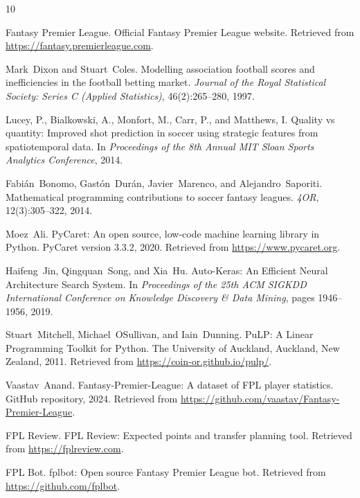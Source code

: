 \documentclass[11pt,english,listoffigures,listoftables]{tfgetsinf}
\begin{document}
\begin{thebibliography}{10}

   Fantasy Premier League.
   \newblock Official Fantasy Premier League website.
   \newblock Retrieved from \url{https://fantasy.premierleague.com}.

   Mark~Dixon and Stuart~Coles.
   \newblock Modelling association football scores and inefficiencies in the football betting market.
   \newblock \textit{Journal of the Royal Statistical Society: Series C (Applied Statistics)}, 46(2):265--280, 1997.

   Lucey, P., Bialkowski, A., Monfort, M., Carr, P., and Matthews, I.
   \newblock Quality vs quantity: Improved shot prediction in soccer using strategic features from spatiotemporal data.
   \newblock In \textit{Proceedings of the 8th Annual MIT Sloan Sports Analytics Conference}, 2014.

   Fabi\'{a}n~Bonomo, Gast\'{o}n~Dur\'{a}n, Javier~Marenco, and Alejandro~Saporiti.
   \newblock Mathematical programming contributions to soccer fantasy leagues.
   \newblock \textit{4OR}, 12(3):305--322, 2014.

   Moez~Ali.
   \newblock PyCaret: An open source, low-code machine learning library in Python.
   \newblock PyCaret version 3.3.2, 2020.
   \newblock Retrieved from \url{https://www.pycaret.org}.

   Haifeng~Jin, Qingquan~Song, and Xia~Hu.
   \newblock Auto-Keras: An Efficient Neural Architecture Search System.
   \newblock In \textit{Proceedings of the 25th ACM SIGKDD International Conference on Knowledge Discovery \& Data Mining}, pages 1946--1956, 2019.

   Stuart~Mitchell, Michael~OSullivan, and Iain~Dunning.
   \newblock PuLP: A Linear Programming Toolkit for Python.
   \newblock The University of Auckland, Auckland, New Zealand, 2011.
   \newblock Retrieved from \url{https://coin-or.github.io/pulp/}.

   Vaastav~Anand.
   \newblock Fantasy-Premier-League: A dataset of FPL player statistics.
   \newblock GitHub repository, 2024.
   \newblock Retrieved from \url{https://github.com/vaastav/Fantasy-Premier-League}.

   FPL Review.
   \newblock FPL Review: Expected points and transfer planning tool.
   \newblock Retrieved from \url{https://fplreview.com}.

   FPL Bot.
   \newblock fplbot: Open source Fantasy Premier League bot.
   \newblock Retrieved from \url{https://github.com/fplbot}.

\end{thebibliography}
\cleardoublepage
\end{document}
